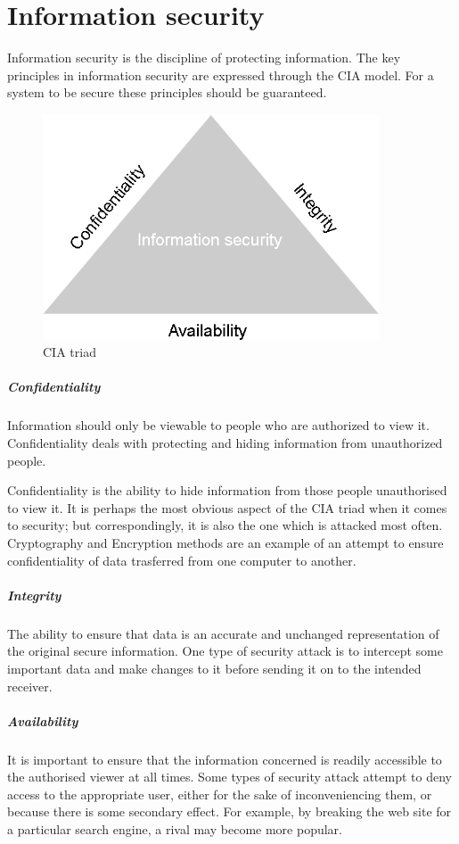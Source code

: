 
\section{Information security}

Information security is the discipline of protecting information. The key principles in information security are expressed through the CIA model. For a system to be secure these principles should be guaranteed.

\begin{figure}[H]
	\centering
	\includegraphics[width=10cm]{figures/cia.png}
	\caption{CIA triad}
	\label{fig:CIA triad}
\end{figure}


\subparagraph{Confidentiality}
Information should only be viewable to people who are authorized to view it. Confidentiality deals with protecting and hiding information from unauthorized people.
 
Confidentiality is the ability to hide information from those people unauthorised to view it. It is perhaps the most obvious aspect of the CIA triad when it comes to security; but correspondingly, it is also the one which is attacked most often. Cryptography and Encryption methods are an example of an attempt to ensure confidentiality of data trasferred from one computer to another.

\subparagraph{Integrity}
The ability to ensure that data is an accurate and unchanged representation of the original secure information. One type of security attack is to intercept some important data and make changes to it before sending it on to the intended receiver.


\subparagraph{Availability}
It is important to ensure that the information concerned is readily accessible to the authorised viewer at all times. Some types of security attack attempt to deny access to the appropriate user, either for the sake of inconveniencing them, or because there is some secondary effect. For example, by breaking the web site for a particular search engine, a rival may become more popular.


